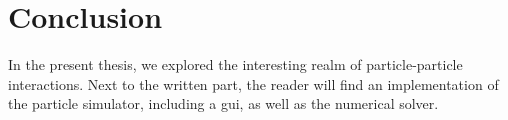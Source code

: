 \chapter{Conclusion}
\label{chap:conclusion}

In the present thesis, we explored the interesting realm of particle-particle interactions.
Next to the written part, the reader will find an implementation of the particle simulator, including a \gls{gui}, as well as the numerical solver.
